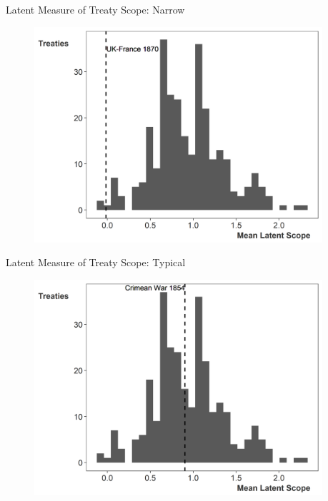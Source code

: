 \documentclass{beamer}
\begin{document}

\begin{frame}{Latent Measure of Treaty Scope: Narrow}

\begin{figure}[htbp]
	\centering
		\includegraphics[width=0.95\textwidth]{ls-hist-narrow.png}
\end{figure}


\end{frame} 


\begin{frame}{Latent Measure of Treaty Scope: Typical}

\begin{figure}[htbp]
	\centering
		\includegraphics[width=0.95\textwidth]{ls-hist-median.png}
\end{figure}


\end{frame} 
\end{document}
